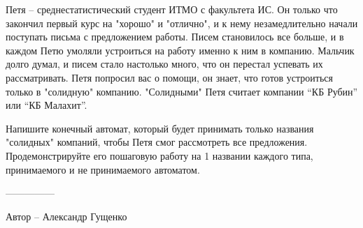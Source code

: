 \question
Петя -- среднестатистический студент ИТМО с факультета ИС. Он только что закончил первый курс на "хорошо" и "отлично", и к нему незамедлительно начали поступать письма с предложением работы. Писем становилось все больше, и в каждом Петю умоляли устроиться на работу именно к ним в компанию. Мальчик долго думал, и писем стало настолько много, что он перестал успевать их рассматривать. Петя попросил вас о помощи, он знает, что готов устроиться только в "солидную" компанию. "Солидными" Петя считает компании “КБ Рубин” или “КБ Малахит”. 

Напишите конечный автомат, который будет принимать только названия "солидных" компаний, чтобы Петя смог рассмотреть все предложения. Продемонстрируйте его пошаговую работу на 1 названии каждого типа, принимаемого и не принимаемого автоматом.

---------------

Автор -- Александр Гущенко
